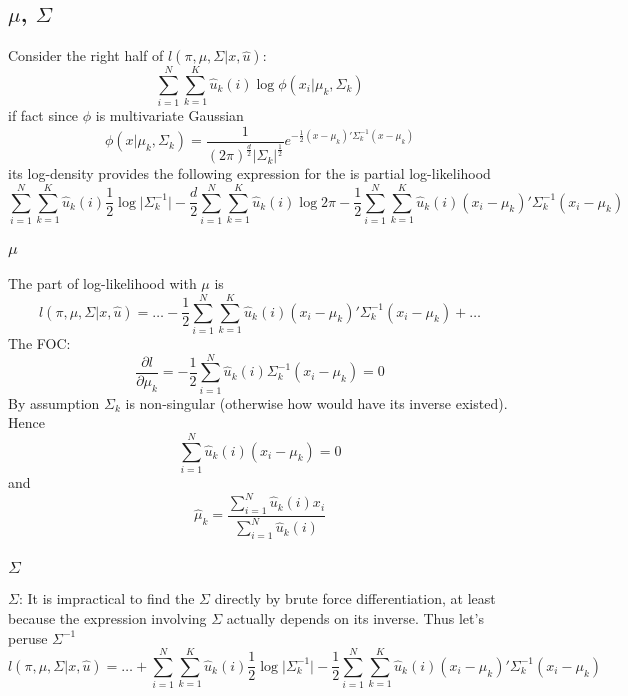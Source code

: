 \documentclass[a4paper]{article}
\begin{document}

\subsection*{$\mu$, $\Sigma$} %
\label{sub:_mu_sigma_}

Consider the right half of $l(\pi, \mu, \Sigma\lvert x, \hat{u})$:
\[\sum_{i=1}^N \sum_{k=1}^K \hat{u}_k(i)\log \phi(x_i\lvert \mu_k, \Sigma_k)\]
if fact since $\phi$ is multivariate Gaussian
\[
\phi(x\lvert \mu_k, \Sigma_k)
= \frac{1}{(2\pi)^\frac{d}{2} \lvert \Sigma_k\rvert^\frac{1}{2} } e^{ -\frac{1}{2} (x-\mu_k)' \Sigma_k^{-1} (x-\mu_k) }
\]
its log-density provides the following expression for the is partial log-likelihood
\[
\sum_{i=1}^N \sum_{k=1}^K \hat{u}_k(i) \frac{1}{2} \log\lvert\Sigma_k^{-1}\rvert 
	- \frac{d}{2} \sum_{i=1}^N \sum_{k=1}^K \hat{u}_k(i) \log2\pi 
	- \frac{1}{2} \sum_{i=1}^N \sum_{k=1}^K \hat{u}_k(i) (x_i-\mu_k)' \Sigma_k^{-1} (x_i-\mu_k)
\]

\subsubsection*{$\mu$} %
\label{ssub:_mu_}

The part of log-likelihood with $\mu$ is
\[
l(\pi, \mu, \Sigma\lvert x, \hat{u})
= \ldots - \frac{1}{2} \sum_{i=1}^N \sum_{k=1}^K \hat{u}_k(i) (x_i-\mu_k)' \Sigma_k^{-1} (x_i-\mu_k) + \ldots
\]
The FOC:
\[
\frac{\partial l}{\partial \mu_k} = - \frac{1}{2} \sum_{i=1}^N \hat{u}_k(i) \Sigma_k^{-1} (x_i-\mu_k) = 0
\]
By assumption $\Sigma_k$ is non-singular (otherwise how would have its inverse existed). Hence
\[\sum_{i=1}^N \hat{u}_k(i) (x_i-\mu_k) = 0\]
and
\[
\hat{\mu}_k = \frac{\sum_{i=1}^N \hat{u}_k(i) x_i }{\sum_{i=1}^N \hat{u}_k(i)}
\]


\subsubsection*{$\Sigma$} %
\label{ssub:_sigma_}

$\Sigma$: It is impractical to find the $\Sigma$ directly by brute force differentiation, at least
because the expression involving $\Sigma$ actually depends on its inverse. Thus let's peruse $\Sigma^{-1}$
\[
l(\pi, \mu, \Sigma\lvert x, \hat{u})
= \ldots + \sum_{i=1}^N \sum_{k=1}^K \hat{u}_k(i) \frac{1}{2} \log\lvert\Sigma_k^{-1}\rvert 
	- \frac{1}{2} \sum_{i=1}^N \sum_{k=1}^K \hat{u}_k(i) (x_i-\mu_k)' \Sigma_k^{-1} (x_i-\mu_k)
\]
\end{document}
